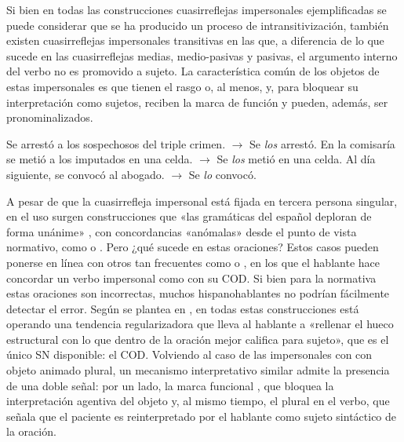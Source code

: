 Si bien en todas las construcciones cuasirreflejas impersonales ejemplificadas se
puede considerar que se ha producido un proceso de intransitivización, también
existen cuasirreflejas impersonales transitivas en las que, a diferencia de lo
que sucede en las cuasirreflejas medias, medio-pasivas y pasivas, el argumento
interno del verbo no es promovido a sujeto. La característica común de los
objetos de estas impersonales es que tienen el rasgo  o, al menos,
 y, para bloquear su interpretación como sujetos, reciben la marca
de función  y pueden, además, ser pronominalizados.

\begin{exe}
  \ex Se arrestó a los sospechosos del triple crimen. $\rightarrow$ Se
      \textit{los} arrestó.
  \ex En la comisaría se metió a los imputados en una celda. $\rightarrow$ Se
      \textit{los} metió en una celda.
  \ex Al día siguiente, se convocó al abogado. $\rightarrow$ Se \textit{lo}
      convocó.
\end{exe}

\begin{recuadro}
A pesar de que la cuasirrefleja impersonal está fijada en tercera persona
singular, en el uso surgen construcciones que «las gramáticas del español
deploran de forma unánime» \parencite[1689]{mendikoetxea1999}, con
concordancias «anómalas» desde el punto de vista normativo, como  o . Pero ¿qué sucede en estas oraciones? Estos casos
pueden ponerse en línea con otros tan frecuentes como  o , en los que el hablante hace concordar un verbo impersonal como
 con su COD. Si bien para la normativa estas oraciones son
incorrectas, muchos hispanohablantes no podrían fácilmente detectar el error.
Según se plantea en \textcite{giammatteo2010}, en todas estas construcciones
está operando una tendencia regularizadora que lleva al hablante a «rellenar el
hueco estructural con lo que dentro de la oración mejor califica para sujeto»,
que es el único SN disponible: el COD. Volviendo al caso de las impersonales con
 con objeto animado plural, un mecanismo interpretativo similar admite
la presencia de una doble señal: por un lado, la marca funcional , que
bloquea la interpretación agentiva del objeto y, al mismo tiempo, el plural en
el verbo, que señala que el paciente es reinterpretado por el hablante como
sujeto sintáctico de la oración.
\end{recuadro}

